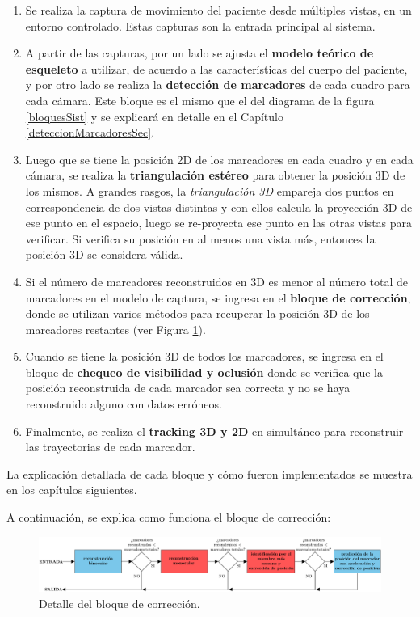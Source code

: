 \begin{enumerate}
\item Se realiza la captura de movimiento del paciente desde múltiples vistas, en un entorno controlado. Estas capturas son la entrada principal al sistema.
\item A partir de las capturas, por un lado se ajusta el \textbf{modelo teórico de esqueleto} a utilizar, de acuerdo a las características del cuerpo del paciente, y por otro lado se realiza la \textbf{detección de marcadores} de cada cuadro para cada cámara. Este bloque es el mismo que el del diagrama de la figura \ref{bloquesSist} y se explicará en detalle en el Capítulo \ref{deteccionMarcadoresSec}.
\item Luego que se tiene la posición 2D de los marcadores en cada cuadro y en cada cámara, se realiza la \textbf{triangulación estéreo} para obtener la posición 3D de los mismos. A grandes rasgos, la \emph{triangulación 3D} empareja dos puntos en correspondencia de dos vistas distintas y con ellos calcula la proyección 3D de ese punto en el espacio, luego se re-proyecta ese punto en las otras vistas para verificar. Si verifica su posición en al menos una vista más, entonces la posición 3D se considera válida.
\item Si el número de marcadores reconstruidos en 3D es menor al número total de marcadores en el modelo de captura, se ingresa en el \textbf{bloque de corrección}, donde se utilizan varios métodos para recuperar la posición 3D de los marcadores restantes (ver Figura \ref{fig:bloqCorr}). 
\item Cuando se tiene la posición 3D de todos los marcadores, se ingresa en el bloque de \textbf{chequeo de visibilidad y oclusión} donde se verifica que la posición reconstruida de cada marcador sea correcta y no se haya reconstruido alguno con datos erróneos.
\item Finalmente, se realiza el \textbf{tracking 3D y 2D} en simultáneo para reconstruir las trayectorias de cada marcador.
\end{enumerate}

La explicación detallada de cada bloque y cómo fueron implementados se muestra en los capítulos siguientes.

A continuación, se explica como funciona el bloque de corrección:

\begin{figure}[H]
\hspace{-1cm}
\includegraphics[scale=0.22]{img/Sistema_completo/BloquesDeCorreccion}
\caption{Detalle del bloque de corrección.}
\label{fig:bloqCorr}
\end{figure}

